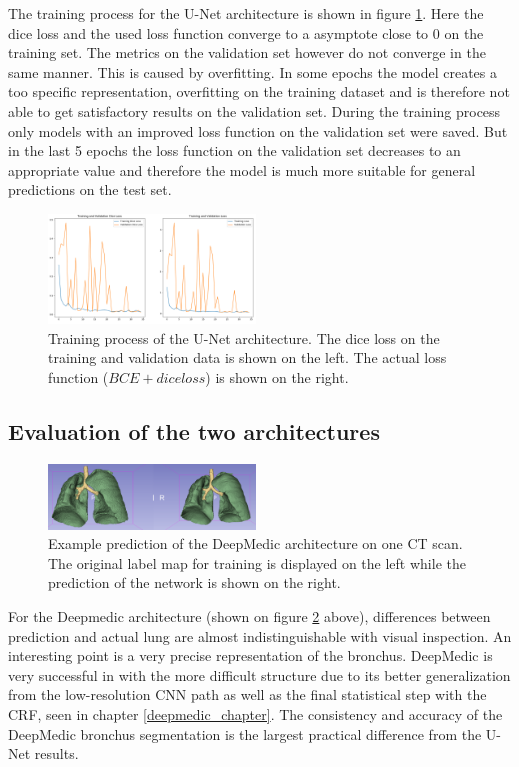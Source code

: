 The training process for the U-Net architecture is shown in figure \ref{train_unet}. Here the dice loss and the used loss function converge to a asymptote close to 0 on the training set. The metrics on the validation set however do not converge in the same manner. This is caused by overfitting. In some epochs the model creates a too specific representation, overfitting on the training dataset and is therefore not able to get satisfactory results on the validation set. During the training process only models with an improved loss function on the validation set were saved. But in the last 5 epochs the loss function on the validation set decreases to an appropriate value and therefore the model is much more suitable for general predictions on the test set.

\begin{figure}[h!]
	\includegraphics[width=0.49\textwidth, angle=0]{files/jpgunettrain.png}
	\caption{Training process of the U-Net architecture. The dice loss on the training and validation data is shown on the left. The actual loss function ($BCE + dice loss$) is shown on the right.}
	\label{train_unet}
\end{figure}

\subsection{Evaluation of the two architectures}

\begin{figure}[h!]
	\includegraphics[width=0.49\textwidth, angle=0]{files/preddeepmedic.png}
	\caption{Example prediction of the DeepMedic architecture on one CT scan. The original label map for training is displayed on the left while the prediction of the network is shown on the right.}
	\label{pred_deepmedic}
\end{figure}

For the Deepmedic architecture (shown on figure \ref{pred_deepmedic} above), differences between prediction and actual lung are almost indistinguishable with visual inspection. An interesting point is a very precise representation of the bronchus. DeepMedic is very successful in with the more difficult structure due to its better generalization from the low-resolution CNN path as well as the final statistical step with the CRF, seen in chapter \ref{deepmedic_chapter}. The consistency and accuracy of the DeepMedic bronchus segmentation is the largest practical difference from the U-Net results.\newline


